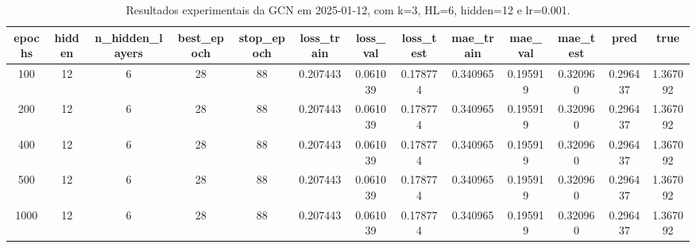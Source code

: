 \begin{table}[h]
\centering
\caption{Resultados experimentais da GCN em 2025-01-12, com k=3, HL=6, hidden=12 e lr=0.001.}
\label{tab:gcn_results_k3_hl6_h12_d20250112}
\begin{tabular}{ccccccccccccc}
\toprule
epochs & hidden & n\_hidden\_layers & best\_epoch & stop\_epoch & loss\_train & loss\_val & loss\_test & mae\_train & mae\_val & mae\_test & pred & true \\
\midrule
100 & 12 & 6 & 28 & 88 & 0.207443 & 0.061039 & 0.178774 & 0.340965 & 0.195919 & 0.320960 & 0.296437 & 1.367092 \\
200 & 12 & 6 & 28 & 88 & 0.207443 & 0.061039 & 0.178774 & 0.340965 & 0.195919 & 0.320960 & 0.296437 & 1.367092 \\
400 & 12 & 6 & 28 & 88 & 0.207443 & 0.061039 & 0.178774 & 0.340965 & 0.195919 & 0.320960 & 0.296437 & 1.367092 \\
500 & 12 & 6 & 28 & 88 & 0.207443 & 0.061039 & 0.178774 & 0.340965 & 0.195919 & 0.320960 & 0.296437 & 1.367092 \\
1000 & 12 & 6 & 28 & 88 & 0.207443 & 0.061039 & 0.178774 & 0.340965 & 0.195919 & 0.320960 & 0.296437 & 1.367092 \\
\bottomrule
\end{tabular}
\end{table}
